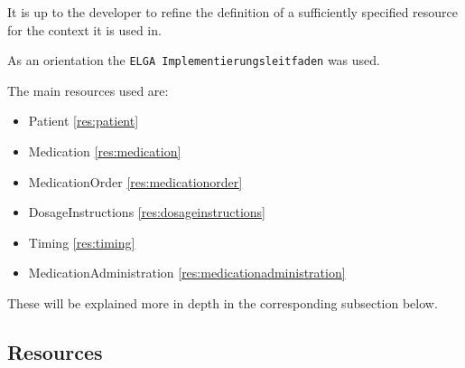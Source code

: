 \documentclass{article}
\begin{document}
It is up to the developer to refine the definition of a sufficiently
specified resource for the context it is used in.

As an orientation the \texttt{ELGA\ Implementierungsleitfaden} was used.

The main resources used are:
\begin{itemize}
\item
  Patient \ref{res:patient}
\item
  Medication \ref{res:medication}
\item
  MedicationOrder \ref{res:medicationorder}
\item
  DosageInstructions \ref{res:dosageinstructions}
\item
  Timing \ref{res:timing}
\item
  MedicationAdministration \ref{res:medicationadministration}
\end{itemize}

These will be explained more in depth in the corresponding
subsection below.

\subsection{Resources}\label{step3}
\end{document}
